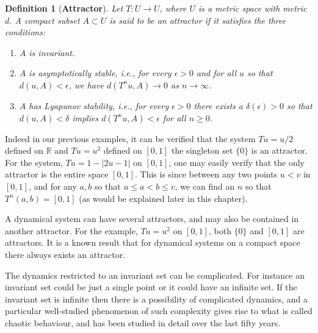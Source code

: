 \documentclass[a4paper,12pt,twoside]{report}
\newtheorem{Definition}{Definition}[]
\begin{document}
\begin{Definition}
  [\bf Attractor]\label{Dfn_Attractor}\rm
  Let $T: U \to U$, where $U$  is a metric space with metric $d$. A compact subset $A \subset U$ is said to be an attractor if it satisfies the three conditions: 
  \vspace{-8mm}
  \begin{enumerate}
	\item $A$ is invariant. 
	\item $A$ is asymptotically stable, i.e., for every $\epsilon > 0$ and for all $u$ so that $d(u,A) < \epsilon$, we have $d(T^nu,A) \to 0$ as $n\to \infty$. 
	\item $A$ has Lyapunov stability, i.e., for every $\epsilon > 0$  there exists a $\delta(\epsilon) > 0$ so that $d(u,A) < \delta$ implies $d(T^nu,A) < \epsilon$ for all $n\ge 0$.  
\end{enumerate}
\end{Definition} 

Indeed in our previous examples, it can be verified that the system  $Tu=u/2$ defined on  $\mathbb{R}$ and $Tu=u^2$ defined on $[0,1]$  the singleton set $\{0\}$ is an attractor.  For the system,  $Tu=1-|2u-1|$ on $[0,1]$, one may easily verify that the only attractor is the entire space $[0,1]$. This is since between any two points $u< v$ in $[0,1]$, and for any $a,b$ so that $u\le a < b \le v$, we can find an $n$ so that $T^n(a,b)=[0,1]$ (as would be explained later in this chapter). 

A dynamical system can have several attractors, and may also be contained in another attractor. For the example, $Tu =u^2$ on $[0,1]$, both $\{0\}$ and $[0,1]$ are attractors. It is a known result that for dynamical systems on a compact space there always exists an attractor. 

The dynamics restricted to an invariant set can be complicated. For instance an invariant set could be just a single point or it could have an infinite set.    If the invariant set is infinite then there is a possibility of complicated dynamics, and a particular well-studied phenomenon of such complexity gives rise to what is called  chaotic behaviour, and has been studied in detail over the last fifty years.

\end{document}
